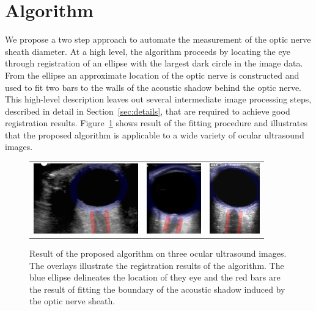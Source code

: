\documentclass{llncs}
\begin{document}
\section{Algorithm}
We propose a two step approach to automate the measurement of the optic nerve
sheath diameter. At a high level, the algorithm proceeds by locating the eye
through registration of an ellipse with the largest dark circle in the image
data. From the ellipse an approximate location of the optic nerve is constructed
and used to fit two bars to the walls of the acoustic shadow behind the optic
nerve. This high-level description leaves out several intermediate image
processing steps, described in detail in Section~\ref{sec:details}, that are
required to achieve good registration results.  Figure~\ref{fig:fitted} shows
result of the fitting procedure and illustrates that the proposed algorithm is
applicable to a wide variety of ocular ultrasound images.
\begin{figure}
\centering
\begin{tabular}{ccc}
\includegraphics[height=1.2in]{003-overlay.png} &
\includegraphics[height=1.2in]{009-overlay.png} &
\includegraphics[height=1.2in]{023-overlay.png} 
\end{tabular}
\caption{
\label{fig:fitted}
Result of the proposed algorithm on three ocular ultrasound images. The
overlays illustrate the registration results of the algorithm. The blue ellipse
delineates the location of they eye and the red bars are the result of fitting
the boundary of the acoustic shadow induced by the optic nerve sheath.
}
\end{figure}
\end{document}
